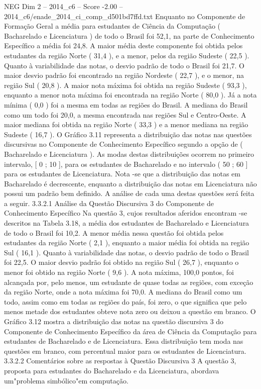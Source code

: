 \begin{textsample}{NEG Dim 2 – 2014\_c6 – Score -2.00 – 2014\_c6/enade\_2014\_ci\_comp\_d501bd7ffd.txt}
Enquanto no Componente de Formação Geral a média para estudantes de Ciência da Computação ( Bacharelado e Licenciatura ) de todo o Brasil foi 52,1, na parte de Conhecimento Específico a média foi 24,8.
A maior média deste componente foi obtida pelos estudantes da região Norte ( 31,4 ), e a menor, pelos da região Sudeste ( 22,5 ).
Quanto à variabilidade das notas, o desvio padrão de todo o Brasil foi 21,7.
O maior desvio padrão foi encontrado na região Nordeste ( 22,7 ), e o menor, na região Sul ( 20,8 ).
A maior nota máxima foi obtida na região Sudeste ( 93,3 ), enquanto a menor nota máxima foi encontrada na região Norte ( 80,0 ).
Já a nota mínima ( 0,0 ) foi a mesma em todas as regiões do Brasil.
A mediana do Brasil como um todo foi 20,0, a mesma encontrada nas regiões Sul e Centro-Oeste.
A maior mediana foi obtida na região Norte ( 33,3 ) e a menor mediana na região Sudeste ( 16,7 ).
O Gráfico 3.11 representa a distribuição das notas nas questões discursivas no Componente de Conhecimento Específico segundo a opção de ( Bacharelado e Licenciatura ).
As modas destas distribuições ocorrem no primeiro intervalo, [ 0 ; 10 ], para os estudantes de Bacharelado e no intervalo ( 50 ; 60 ] para os estudantes de Licenciatura.
Nota -se que a distribuição das notas em Bacharelado é decrescente, enquanto a distribuição das notas em Licenciatura não possui um padrão bem definido.
A análise de cada uma destas questões será feita a seguir. 3.3.2.1 Análise da Questão Discursiva 3 do Componente de Conhecimento Específico Na questão 3, cujos resultados aferidos encontram -se descritos na Tabela 3.18, a média dos estudantes de Bacharelado e Licenciatura de todo o Brasil foi 10,2.
A menor média nessa questão foi obtida pelos estudantes da região Norte ( 2,1 ), enquanto a maior média foi obtida na região Sul ( 16,1 ).
Quanto à variabilidade das notas, o desvio padrão de todo o Brasil foi 22,5.
O maior desvio padrão foi obtido na região Sul ( 26,7 ), enquanto o menor foi obtido na região Norte ( 9,6 ).
A nota máxima, 100,0 pontos, foi alcançada por, pelo menos, um estudante de quase todas as regiões, com exceção da região Norte, onde a nota máxima foi 70,0.
A mediana do Brasil como um todo, assim como em todas as regiões do país, foi zero, o que significa que pelo menos metade dos estudantes obteve nota zero ou deixou a questão em branco.
O Gráfico 3.12 mostra a distribuição das notas na questão discursiva 3 do Componente de Conhecimento Específico da área de Ciência da Computação para estudantes de Bacharelado e de Licenciatura.
Essa distribuição tem moda nas questões em branco, com percentual maior para os estudantes de Licenciatura. 3.3.2.2 Comentários sobre as respostas à Questão Discursiva 3 A questão 3, proposta para estudantes do Bacharelado e da Licenciatura, abordava um"problema simbólico"em computação.

\end{textsample}
